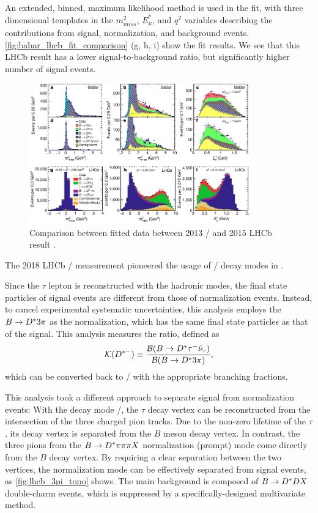 An extended, binned, maximum likelihood method is used in the fit, with three
dimensional templates in the $m^2_{miss}$, $E^*_\mu$, and $q^2$ variables
describing the contributions from signal, normalization, and background events.
\autoref{fig:babar_lhcb_fit_comparison} (g, h, i) show the fit results.
We see that this LHCb result has a lower signal-to-background ratio, but
significantly higher number of signal events.

\begin{figure}[ht]
    \centering
    \includegraphics[width=0.85\textwidth]{figs/babar_lhcb_fit_comparison.pdf}
    \caption{
        Comparison between fitted data between 2013 \BaBar/ and 2015
        LHCb result \cite{Ciezarek:2017yzh}.
    }
    \label{fig:babar_lhcb_fit_comparison}
\end{figure}

The 2018 LHCb \RDst/ measurement pioneered the usage of \TauHadMode/ decay modes
in \BDstMode{\tau}.

Since the $\tau$ lepton is reconstructed with the hadronic modes, the final
state particles of signal events are different from those of normalization
events.
Instead, to cancel experimental systematic uncertainties, this analysis employs
the $B \rightarrow \Dst/ 3\pi$ as the normalization, which has the same final
state particles as that of the signal.
This analysis measures the ratio, defined as
\begin{equation}
    \mathcal{K}(D^{*-}) \equiv \frac{
        \mathcal{B}(\BDstMode{\tau})
    }{
        \mathcal{B}(B \rightarrow \Dst/ 3 \pi)
    },
\end{equation}
which can be converted back to \RDst/ with the appropriate branching fractions.

This analysis took a different approach to separate signal from normalization
events:
With the decay mode \TauHadMode/,
the $\tau$ decay vertex can be reconstructed from the intersection of the three
charged pion tracks.
Due to the non-zero lifetime of the $\tau$, its decay vertex is separated from
the $B$ meson decay vertex.
In contrast, the three pions from the $B \rightarrow \Dst/ \pi \pi \pi X$
normalization (prompt) mode come directly from the $B$ decay vertex.
By requiring a clear separation between the two vertices, the normalization mode
can be effectively separated from signal events, as \autoref{fig:lhcb_3pi_topo}
shows.
The main background is composed of $B \rightarrow \Dst/ D X$ double-charm
events, which is suppressed by a specifically-designed multivariate method.

